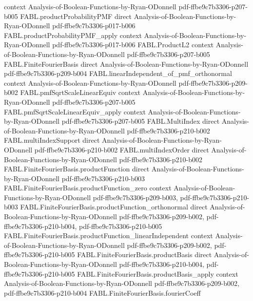 \begin{theorem}
  {context}
  {Analysis-of-Boolean-Functions-by-Ryan-ODonnell}
  {pdf-ffbe9c7b3306-p207-b005}
\proofstep
  {FABL.productProbabilityPMF}
  {direct}
  {Analysis-of-Boolean-Functions-by-Ryan-ODonnell}
  {pdf-ffbe9c7b3306-p017-b006}
\proofstep
  {FABL.productProbabilityPMF_apply}
  {context}
  {Analysis-of-Boolean-Functions-by-Ryan-ODonnell}
  {pdf-ffbe9c7b3306-p017-b006}
\proofstep
  {FABL.ProductL2}
  {context}
  {Analysis-of-Boolean-Functions-by-Ryan-ODonnell}
  {pdf-ffbe9c7b3306-p207-b005}
\proofstep
  {FABL.FiniteFourierBasis}
  {direct}
  {Analysis-of-Boolean-Functions-by-Ryan-ODonnell}
  {pdf-ffbe9c7b3306-p209-b004}
\proofstep
  {FABL.linearIndependent_of_pmf_orthonormal}
  {context}
  {Analysis-of-Boolean-Functions-by-Ryan-ODonnell}
  {pdf-ffbe9c7b3306-p209-b002}
\proofstep
  {FABL.pmfSqrtScaleLinearEquiv}
  {context}
  {Analysis-of-Boolean-Functions-by-Ryan-ODonnell}
  {pdf-ffbe9c7b3306-p207-b005}
\proofstep
  {FABL.pmfSqrtScaleLinearEquiv_apply}
  {context}
  {Analysis-of-Boolean-Functions-by-Ryan-ODonnell}
  {pdf-ffbe9c7b3306-p207-b005}
\proofstep
  {FABL.MultiIndex}
  {direct}
  {Analysis-of-Boolean-Functions-by-Ryan-ODonnell}
  {pdf-ffbe9c7b3306-p210-b002}
\proofstep
  {FABL.multiIndexSupport}
  {direct}
  {Analysis-of-Boolean-Functions-by-Ryan-ODonnell}
  {pdf-ffbe9c7b3306-p210-b002}
\proofstep
  {FABL.multiIndexOrder}
  {direct}
  {Analysis-of-Boolean-Functions-by-Ryan-ODonnell}
  {pdf-ffbe9c7b3306-p210-b002}
\proofstep
  {FABL.FiniteFourierBasis.productFunction}
  {direct}
  {Analysis-of-Boolean-Functions-by-Ryan-ODonnell}
  {pdf-ffbe9c7b3306-p210-b003}
\proofstep
  {FABL.FiniteFourierBasis.productFunction_zero}
  {context}
  {Analysis-of-Boolean-Functions-by-Ryan-ODonnell}
  {pdf-ffbe9c7b3306-p209-b003,
    pdf-ffbe9c7b3306-p210-b003}
\proofstep
  {FABL.FiniteFourierBasis.productFunction_orthonormal}
  {direct}
  {Analysis-of-Boolean-Functions-by-Ryan-ODonnell}
  {pdf-ffbe9c7b3306-p209-b002,
    pdf-ffbe9c7b3306-p210-b004,
    pdf-ffbe9c7b3306-p210-b005}
\proofstep
  {FABL.FiniteFourierBasis.productFunction_linearIndependent}
  {context}
  {Analysis-of-Boolean-Functions-by-Ryan-ODonnell}
  {pdf-ffbe9c7b3306-p209-b002,
    pdf-ffbe9c7b3306-p210-b005}
\proofstep
  {FABL.FiniteFourierBasis.productBasis}
  {direct}
  {Analysis-of-Boolean-Functions-by-Ryan-ODonnell}
  {pdf-ffbe9c7b3306-p210-b004,
    pdf-ffbe9c7b3306-p210-b005}
\proofstep
  {FABL.FiniteFourierBasis.productBasis_apply}
  {context}
  {Analysis-of-Boolean-Functions-by-Ryan-ODonnell}
  {pdf-ffbe9c7b3306-p209-b002,
    pdf-ffbe9c7b3306-p210-b004}
\proofstep
  {FABL.FiniteFourierBasis.fourierCoeff}

\end{theorem}
